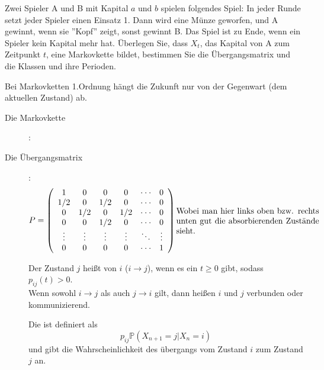 \begin{uebsp}
\begin{Exercise}[label=ex:4.1]
Zwei Spieler A und B mit Kapital $a$ und $b$ spielen folgendes Spiel: In jeder Runde setzt jeder Spieler einen Einsatz 1. Dann wird eine Münze geworfen, und A gewinnt, wenn sie ''Kopf'' zeigt, sonst gewinnt B. Das Spiel ist zu Ende, wenn ein Spieler kein Kapital mehr hat. Überlegen Sie, dass $X_t$, das Kapital von A zum Zeitpunkt $t$, eine Markovkette bildet, bestimmen Sie die Übergangsmatrix und die Klassen und ihre Perioden.
\end{Exercise}
\begin{Answer}

\begin{uebsp_theory}
    Bei Markovketten 1.Ordnung hängt die Zukunft nur von der Gegenwart (dem aktuellen Zustand) ab.
\end{uebsp_theory}

\begin{description}
    \item [Die Markovkette]:\\
        
    \item [Die Übergangsmatrix]:
\[P=\left(\begin{array}{cccccc}
    1 & 0 & 0 & 0 & \cdot\cdot\cdot & 0\\
    1/2 & 0 & 1/2 & 0 & \cdot\cdot\cdot & 0\\
    0 & 1/2 & 0 & 1/2 & \cdot\cdot\cdot & 0\\
    0 & 0 & 1/2 & 0 & \cdot\cdot\cdot & 0\\
    \vdots & \vdots & \vdots & \vdots& \ddots & \vdots\\
    0 & 0 & 0 & 0 & \cdot\cdot\cdot & 1\\
\end{array}\right)\text{\parbox{0.5\linewidth}{Wobei man hier links oben bzw. rechts unten gut die absorbierenden Zustände sieht.}}\]

\begin{uebsp_theory}
    Der Zustand $j$ heißt  von $i$ ($i\rightarrow j$), wenn es ein $t\ge 0$ gibt, sodass $p_{ij}(t)>0$.\\
    Wenn sowohl $i\rightarrow j$ als auch $j\rightarrow i$ gilt, dann heißen $i$ und $j$ verbunden oder kommunizierend.
\end{uebsp_theory}

\begin{uebsp_theory}
    Die  ist definiert als \[p_{ij}\mathbb P(X_{n+1}=j|X_n=i)\] und gibt die Wahrscheinlichkeit des übergangs vom Zustand $i$ zum Zustand $j$ an. 
\end{uebsp_theory}


\end{description}
\end{Answer}
\end{uebsp}
